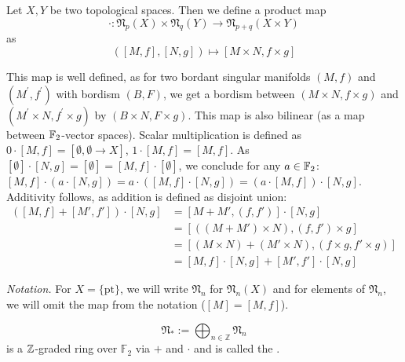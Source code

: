 \documentclass[a4paper,11pt]{article}
\begin{document}
\begin{definition}
    Let \(X,Y\) be two topological spaces. Then we define a product map
    \[\cdot:\mathfrak{N}_p(X)\times\mathfrak{N}_q(Y)\to\mathfrak{N}_{p+q}(X\times Y)\]
    as
    \[([M,f],[N,g])\mapsto [M\times N,f\times g]\]
\end{definition}

\begin{observation}
    This map is well defined, as for two bordant singular manifolds \((M,f)\) and \((M^\prime,f^\prime)\) with bordism \((B,F)\), we get a bordism between \((M\times N,f\times g)\) and \((M^\prime\times N, f^\prime\times g)\) by \((B\times N, F\times g)\). 
    This map is also bilinear (as a map between \(\mathbb{F}_2\)-vector spaces). Scalar multiplication is defined as \(0\cdot[M,f]=[\emptyset,\emptyset\to X]\), \(1\cdot[M,f]=[M,f]\). As \([\emptyset]\cdot[N,g]=[\emptyset]=[M,f]\cdot[\emptyset]\), we conclude for any \(a\in\mathbb{F}_2\): \([M,f]\cdot(a\cdot[N,g])=a\cdot([M,f]\cdot[N,g])=(a\cdot[M,f])\cdot[N,g]\). Additivity follows, as addition is defined as disjoint union: 
    \begin{align*}
        ([M,f]+[M',f'])\cdot[N,g]&=[M+M',(f,f')]\cdot[N,g]\\
        &=[((M+M')\times N ),(f,f')\times g]\\
        &= [(M\times N) + (M'\times N),(f\times g,f'\times g)]\\
        &=[M,f]\cdot[N,g]+[M',f']\cdot[N,g]\end{align*}
\end{observation}


\noindent\textit{Notation.} For \(X=\{\mathrm{pt}\}\), we will write \(\mathfrak{N}_n\) for \(\mathfrak{N}_n(X)\) and for elements of \(\mathfrak{N}_n\), we will omit the map from the notation (\([M]=[M,f]\)).

\begin{definition}
    \[\mathfrak{N}_\ast:=\bigoplus_{n\in\mathbb{Z}}\mathfrak{N}_n\]
    is a \(\mathbb{Z}\)-graded ring over \(\mathbb{F}_2\) via \(+\) and \(\cdot\) and is called the .
\end{definition}
\end{document}

